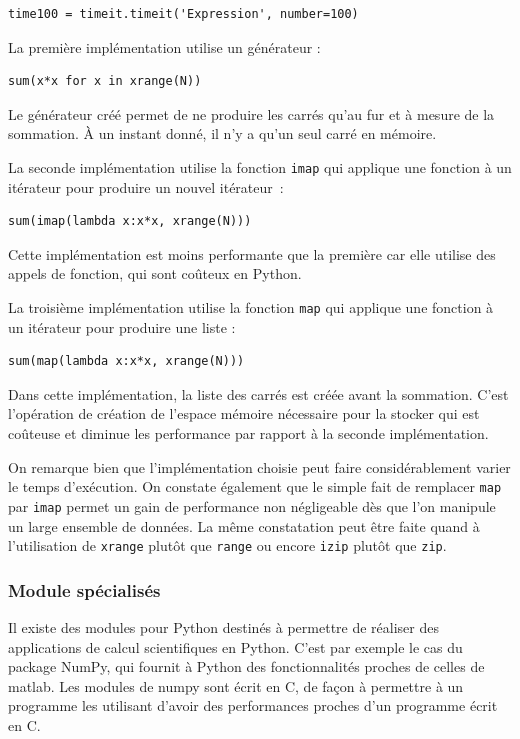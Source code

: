 \documentclass[a4paper]{article}
\begin{document}
\begin{lstlisting}
time100 = timeit.timeit('Expression', number=100)
\end{lstlisting}

La première implémentation utilise un générateur :

\begin{lstlisting}
sum(x*x for x in xrange(N))
\end{lstlisting}

Le générateur créé permet de ne produire les carrés qu'au fur et à
mesure de la sommation. À un instant donné, il n'y a qu'un seul carré
en mémoire.

La seconde implémentation utilise la fonction \texttt{imap} qui
applique une fonction à un itérateur pour produire un nouvel
itérateur~:

\begin{lstlisting}
sum(imap(lambda x:x*x, xrange(N)))
\end{lstlisting}

Cette implémentation est moins performante que la première car elle
utilise des appels de fonction, qui sont coûteux en
Python\cite{CallOverhead}.

La troisième implémentation utilise la fonction \texttt{map} qui
applique une fonction à un itérateur pour produire une liste :

\begin{lstlisting}
sum(map(lambda x:x*x, xrange(N)))
\end{lstlisting}

Dans cette implémentation, la liste des carrés est créée avant la
sommation. C'est l'opération de création de l'espace mémoire
nécessaire pour la stocker qui est coûteuse et diminue les performance
par rapport à la seconde implémentation.

On remarque bien que l'implémentation choisie peut faire
considérablement varier le temps d'exécution. On constate également
que le simple fait de remplacer \texttt{map} par \texttt{imap} permet
un gain de performance non négligeable dès que l'on manipule un large
ensemble de données. La même constatation peut être faite quand à
l'utilisation de \texttt{xrange} plutôt que \texttt{range} ou encore
\texttt{izip} plutôt que \texttt{zip}.

\subsubsection{Module spécialisés}

Il existe des modules pour Python destinés à permettre de réaliser des
applications de calcul scientifiques en Python.  C'est par exemple le
cas du package NumPy, qui fournit à Python des fonctionnalités proches
de celles de matlab. Les modules de numpy sont écrit en C, de façon à
permettre à un programme les utilisant d'avoir des performances
proches d'un programme écrit en C\cite{NumPyPerf}.
\end{document}
